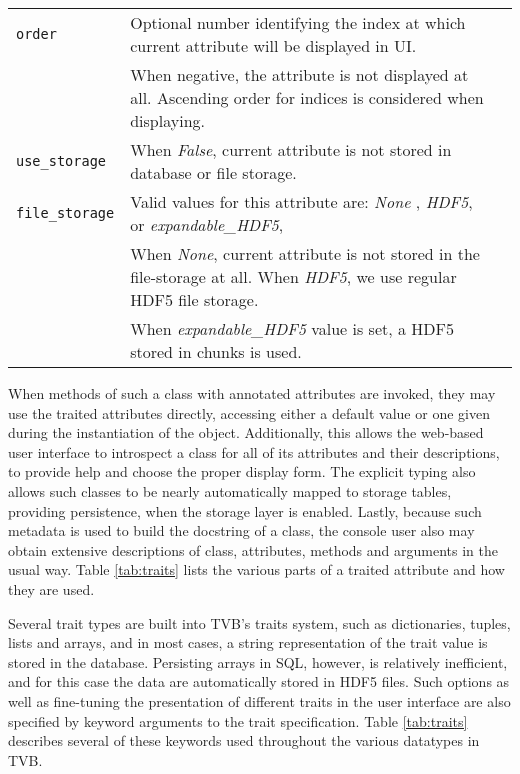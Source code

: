 \documentclass{bioinfo}
\begin{document}
\begin{center}
\begin{table*}[ht]
\begin{tabularx}{\textwidth}{lll}
			\texttt{order}            & Optional number identifying the index at which current attribute will be displayed in UI. \\
						  & When negative, the attribute is not displayed at all. Ascending order for indices is considered when displaying. \\
			\texttt{use\_storage}     & When \emph{False}, current attribute is not stored in database or file storage. \\
			\texttt{file\_storage}    & Valid values for this attribute are: \emph{None} , \emph{HDF5}, or  \emph{expandable\_HDF5}, \\
						  & When \emph{None}, current attribute is not stored in the file-storage at all. When \emph{HDF5}, we use regular HDF5 file storage. \\
						  & When \emph{expandable\_HDF5} value is set, a HDF5 stored in chunks is used. \\
			\bottomrule
			\end{tabularx}
  	\caption{TVB currently available Traited Attributes}
  	\label{tab:traits}
	\end{table*}
\end{center}

When methods of such a class with annotated attributes are invoked, they may use
the traited attributes directly, accessing either a default value or one given
during the instantiation of the object. Additionally, this allows the web-based
user interface to introspect a class for all of its attributes and their
descriptions, to provide help and choose the proper display form. The explicit
typing also allows such classes to be nearly automatically mapped to storage
tables, providing persistence, when the storage layer is enabled.  Lastly,
because such metadata is used to build the docstring of a class, the console
user also may obtain extensive descriptions of class, attributes, methods and
arguments in the usual way. Table \ref{tab:traits} lists the various parts 
of a traited attribute and how they are used. 

Several trait types are built into TVB's traits system, such as dictionaries,
tuples, lists and arrays, and in most cases, a string representation of the
trait value is stored in the database.  Persisting arrays in SQL, however, is
relatively inefficient, and for this case the data are automatically stored in
HDF5 files. Such options as well as fine-tuning the presentation of different
traits in the user interface are also specified by keyword arguments to the
trait specification.  Table \ref{tab:traits} describes several of these
keywords used throughout the various datatypes in TVB.
\end{document}
